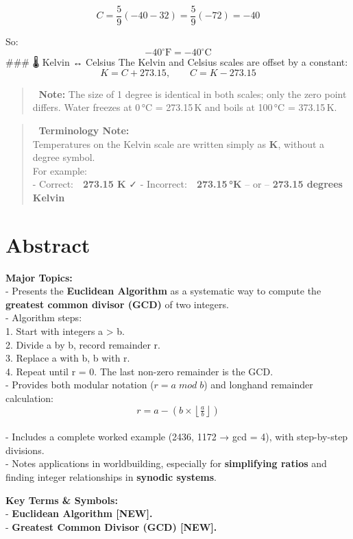 \documentclass[
  letterpaper,
]{book}
\begin{document}
\[
C = \frac{5}{9}(-40 - 32) = \frac{5}{9}(-72) = -40
\]

So: \[
-40^\circ \text{F} = -40^\circ \text{C}
\] \#\#\# 🌡️ Kelvin ↔ Celsius The Kelvin and Celsius scales are offset
by a constant: \[
K = C + 273.15, \qquad C = K - 273.15
\]

\begin{quote}
📎 \textbf{Note:} The size of 1 degree is identical in both scales; only
the zero point differs. Water freezes at 0\,°C = 273.15\,K and boils at
100\,°C = 373.15\,K.
\end{quote}

\begin{quote}
📎 \textbf{Terminology Note:}\\
Temperatures on the Kelvin scale are written simply as \textbf{K},
without a degree symbol.\\
For example:\\
- Correct: \textbf{273.15 K} ✓ - Incorrect: \textbf{273.15\,°K} -- or --
\textbf{273.15 degrees Kelvin}
\end{quote}

\section{Abstract}\label{abstract-3}

\textbf{Major Topics:}\\
- Presents the \textbf{Euclidean Algorithm} as a systematic way to
compute the \textbf{greatest common divisor (GCD)} of two integers.\\
- Algorithm steps:\\
1. Start with integers a \textgreater{} b.\\
2. Divide a by b, record remainder r.\\
3. Replace a with b, b with r.\\
4. Repeat until r = 0. The last non-zero remainder is the GCD.\\
- Provides both modular notation (\(r = a \;mod\; b\)) and longhand
remainder calculation:\\
\[
  r = a - \left(b \times \left\lfloor \tfrac{a}{b} \right\rfloor \right)
  \]\\
- Includes a complete worked example (2436, 1172 → gcd = 4), with
step-by-step divisions.\\
- Notes applications in worldbuilding, especially for
\textbf{simplifying ratios} and finding integer relationships in
\textbf{synodic systems}.

\textbf{Key Terms \& Symbols:}\\
- \textbf{Euclidean Algorithm {[}NEW{]}.}\\
- \textbf{Greatest Common Divisor (GCD) {[}NEW{]}.}
\end{document}
